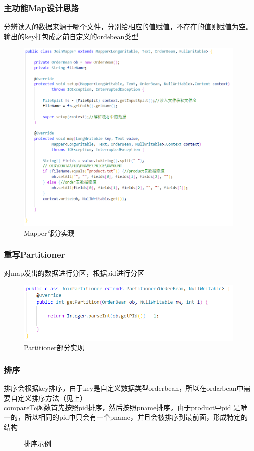 \documentclass[a4paper,UTF8]{article}
\numberwithin{equation}{section}
\begin{document}
\subsubsection{主功能Map设计思路}
分辨读入的数据来源于哪个文件，分别给相应的值赋值，不存在的值则赋值为空。输出的key打包成之前自定义的ordebean类型
\begin{figure}[H]
    \centering

    \includegraphics[width = 15cm]{map1.png}

    \caption{Mapper部分实现}
    \label{mapper}
\end{figure}
\subsubsection{重写Partitioner}
对map发出的数据进行分区，根据pid进行分区
\begin{figure}[H]
    \centering

    \includegraphics[width = 15cm]{part1.png}

    \caption{Partitioner部分实现}
\end{figure}
\subsubsection{排序}
排序会根据key排序，由于key是自定义数据类型orderbean，所以在orderbean中需要自定义排序方法（见上）\\
compareTo函数首先按照pid排序，然后按照pname排序。由于product中pid 是唯一的，所以相同的pid中只会有一个pname，并且会被排序到最前面，形成特定的结构
\begin{figure}[H]
    \centering
    \vfill
    \caption{排序示例}
\end{figure}
\end{document}
